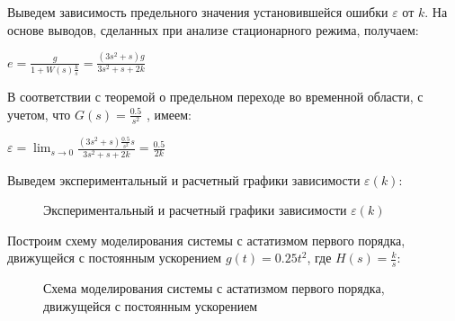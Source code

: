\documentclass[a4paper, 11pt]{article}
\begin{document}
\par 
Выведем зависимость  предельного значения установившейся ошибки $\varepsilon$ от $k$. На основе выводов, сделанных  при анализе стационарного режима, получаем:
\par 
$e=\displaystyle\frac{g}{1+W(s)\frac{k}{s}}=\frac{(3s^2+s)g}{3s^2+s+2k}$
\par 
В соответствии с теоремой о предельном переходе во временной области, с учетом, что $G(s) = \frac{0.5}{s^2}$ , имеем:
\par 
$\varepsilon=\lim_{s\to 0}\displaystyle\frac{(3s^2+s)\frac{0.5}{s^2}s}{3s^2+s+2k}=\frac{0.5}{2k}$
\par 
Выведем экспериментальный и расчетный графики зависимости $\varepsilon(k)$:

\newpage
\begin{figure}[h!]
\caption{Экспериментальный и расчетный графики зависимости $\varepsilon(k)$}
\label{ris:image}
\end{figure}

\par 
Построим схему моделирования системы с астатизмом первого порядка, движущейся с постоянным ускорением $g(t)=0.25t^2$, где $H(s)=\frac{k}{s}$:

\begin{figure}[h!]
\caption{Схема моделирования системы с астатизмом первого порядка, движущейся с постоянным ускорением}
\label{ris:image}
\end{figure}
\end{document}
